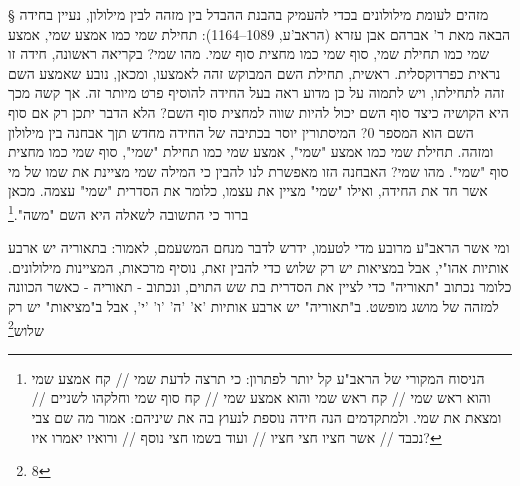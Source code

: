       § מזהים לעומת מילולונים
      בכדי להעמיק בהבנת ההבדל בין מזהה לבין מילולון, נעיין בחידה הבאה מאת ר' אברהם
      אבן עזרא (הראב'ע, 1089–1164): תחילת שמי כמו אמצע שמי, אמצע שמי כמו תחילת שמי,
      סוף שמי כמו מחצית סוף שמי. מהו שמי?  בקריאה ראשונה, חידה זו נראית כפרדוקסלית.
      ראשית, תחילת השם המבוקש זהה לאמצעו, ומכאן, נובע שאמצע השם זהה לתחילתו, ויש
      לתמוה על כן מדוע ראה בעל החידה להוסיף פרט מיותר זה. אך קשה מכך היא הקושיה כיצד
      סוף השם יכול להיות שווה למחצית סוף השם? הלא הדבר יתכן רק אם סוף השם הוא המספר
      0?
      המיסתורין יוסר בכתיבה של החידה מחדש תןך אבחנה בין מילולון ומזהה.  תחילת שמי כמו
      אמצע "שמי", אמצע שמי כמו תחילת "שמי", סוף שמי כמו מחצית סוף "שמי". מהו שמי?
      האבחנה הזו מאפשרת לנו להבין כי המילה שמי מציינת את שמו של מי אשר חד את החידה,
      ואילו "שמי" מציין את עצמו, כלומר את הסדרית "שמי" עצמה. מכאן ברור כי התשובה
      לשאלה היא השם "משה".\footnote{הניסוח המקורי של הראב"ע קל יותר לפתרון: כי תרצה לדעת שמי // קח אמצע שמי והוא ראש שמי // קח ראש שמי והוא אמצע שמי // קח סוף שמי וחלקהו לשניים // ומצאת את שמי. ולמתקדמים הנה חידה נוספת לנעוץ בה את שיניהם: אמור מה שם צבי נכבד // אשר חציו חצי חציו // ועוד בשמו חצי נוסף // ורואיו יאמרו איו?}

      ומי אשר הראב"ע מרובע מדי לטעמו, ידרש לדבר מנחם המשעמם, לאמור: בתאוריה יש ארבע
      אותיות אהו"י, אבל במציאות יש רק שלוש
      כדי להבין זאת, נוסיף מרכאות, המציינות מילולונים. כלומר נכתוב "תאוריה" כדי לציין את הסדרית בת שש התוים, ונכתוב - תאוריה - כאשר הכוונה למזהה של מושג מופשט.
      ב"תאוריה" יש ארבע אותיות 'א' 'ה' 'ו' 'י',
      אבל ב"מציאות" יש רק שלוש\footnote{8}

